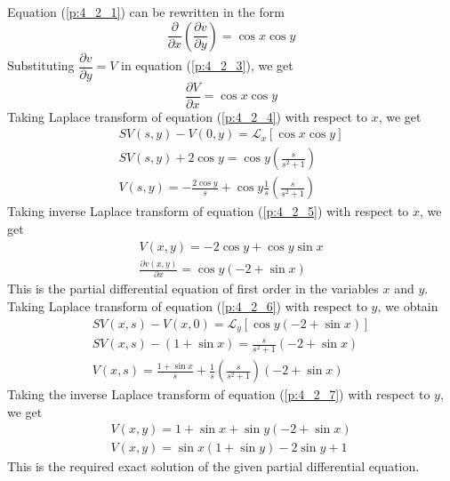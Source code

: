 \documentclass[11pt]{report}
\newcommand{\Laplace}{\mathcal{L}}
\newcommand{\NI}{\noindent}
\newcommand{\sps}{\\[0.2cm]}
\newcommand{\dsp}{\displaystyle}
\begin{document}
	\NI Equation (\ref{p:4_2_1}) can be rewritten in the form 
	\begin{equation}
		\dfrac{\partial}{\partial x}\left(\frac{\partial v}{\partial y}\right) = \cos x\cos y \label{p:4_2_3} \tag{3}
	\end{equation}
	Substituting $\dfrac{\partial v}{\partial y} = V$ in equation (\ref{p:4_2_3}), we get
	\begin{equation}
		\frac{\partial V}{\partial x} = \cos x\cos y \label{p:4_2_4} \tag{4}
	\end{equation}
	Taking Laplace transform of equation (\ref{p:4_2_4}) with respect to $x$, we get
	\begin{equation}
		\begin{array}{l}
			SV(s,y) - V(0,y) = \Laplace_x\left[\cos x \cos y\right]\sps
			\dsp SV(s,y) + 2\cos y = \cos y \left(\frac{s}{s^2+1}\right)\sps
			\dsp V(s,y) = -\frac{2\cos y}{s} + \cos y \frac{1}{s}\left(\frac{s}{s^2 + 1}\right)
		\end{array}\label{p:4_2_5} \tag{5}
	\end{equation}
	Taking inverse Laplace transform of equation (\ref{p:4_2_5}) with respect to $x$, we get
	\begin{equation}
		\begin{array}{l}
			V(x,y) = -2\cos y + \cos y\sin x\sps
			\dsp\frac{\partial v(x,y)}{\partial x}=\cos y(-2 + \sin x)
		\end{array}\label{p:4_2_6} \tag{6}
	\end{equation}
	This is the partial differential equation of first order in  the variables $x$ and $y$.\sps
	Taking Laplace transform of equation (\ref{p:4_2_6}) with respect to $y$, we obtain
	\begin{equation}
		\begin{array}{l}
			\dsp SV(x,s)-V(x,0) = \Laplace_y\left[\cos y(-2+\sin x)\right]\sps
			\dsp SV(x,s)-(1+\sin x) = \dsp\frac{s}{s^2 + 1}(-2 + \sin x)\sps
			\dsp V(x,s) = \frac{1+\sin x}{s} + \frac{1}{s}\left(\frac{s}{s^2+1}\right)(-2+\sin x)
		\end{array}\label{p:4_2_7} \tag{7}
	\end{equation}
	Taking the inverse Laplace transform of equation (\ref{p:4_2_7}) with respect to $y$, we get
	\begin{equation*}
		\begin{array}{l}
			\dsp V(x,y)= 1+\sin x + \sin y(-2 + \sin x)\sps
			\dsp V(x,y) = \sin x(1+\sin y) - 2\sin y + 1
		\end{array}
	\end{equation*}
	This is the required exact solution of the given partial differential equation.



	\chapter{}
	
	
	
	
	
	
	
	
	
	
	
	
	
\end{document}
